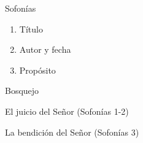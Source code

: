 \documentclass[12pt]{article}
\begin{document}
\begin{section}{Sofonías}
	\begin{enumerate}
		\item Título\\
		\item Autor y fecha\\
		\item Propósito\\
	\end{enumerate}
	\begin{subsection}{Bosquejo}
	\begin{subsubsection}{El juicio del Señor (Sofonías 1-2)}
	\end{subsubsection}
	\begin{subsubsection}{La bendición del Señor (Sofonías 3)}
	\end{subsubsection}
	\end{subsection}
\end{section}
\end{document}
